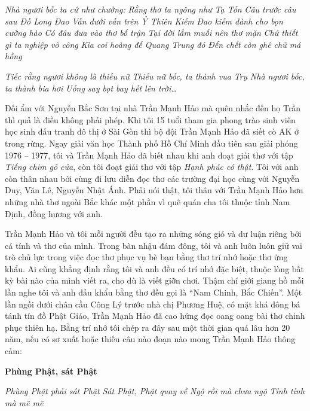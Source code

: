 \documentclass[../main.tex]{subfiles}
\begin{document}
\begin{multicols}{2}
\begin{blockquote}
\textit{Nhà ngươi bốc ta cứ như chưởng:}        
\textit{Rằng thơ ta ngông như Tạ Tốn}        
\textit{Câu trước câu sau Ðồ Long Ðao}        
\textit{Vần dưới vần trên Ỷ Thiên Kiếm}        
\textit{Ðao kiếm dành cho bọn cường hào}        
\textit{Có đâu đưa vào thơ bố trận}        
\textit{Tại đời lắm muối nên thơ mặn}        
\textit{Chứ thiết gì ta nghiệp võ công}        
\textit{Kìa coi hoàng đế Quang Trung đó} 
\textit{Ðến chết còn ghê chữ má hồng} 
        
\textit{Tiếc rằng ngươi không là thiếu nữ}        
\textit{Thiếu nữ bốc, ta thành vua Trụ}        
\textit{Nhà ngươi bốc, ta thành bia hơi} 
\textit{Uống say bọt bay hết lên trời…} 

\end{blockquote}
 
Ðối ẩm với Nguyễn Bắc Sơn tại nhà Trần Mạnh Hảo mà quên nhắc đến họ Trần thì quả là điều không phải phép. Khi tôi 15 tuổi tham gia phong trào sinh viên học sinh đấu tranh đô thị ở Sài Gòn thì bộ đội Trần Mạnh Hảo đã siết cò AK ở trong rừng. Ngay giải văn học Thành phố Hồ Chí Minh đầu tiên sau giải phóng 1976 – 1977, tôi và Trần Mạnh Hảo đã biết nhau khi anh đoạt giải thơ với tập \textit{Tiếng chim gõ cửa}, còn tôi đoạt giải thơ với tập \textit{Hạnh phúc có thật}. Tôi với anh còn thân nhau bởi cùng đi lưu diễn đọc thơ các trường đại học cùng với Nguyễn Duy, Văn Lê, Nguyễn Nhật Ánh. Phải nói thật, tôi thân với Trần Mạnh Hảo hơn những nhà thơ ngoài Bắc khác một phần vì quê quán cha tôi thuộc tỉnh Nam Ðịnh, đồng hương với anh. 
 
Trần Mạnh Hảo và tôi mỗi người đều tạo ra những sóng gió và dư luận riêng bởi cá tính và thơ của mình. Trong bàn nhậu đám đông, tôi và anh luôn luôn giữ vai trò chủ lực trong việc đọc thơ phục vụ bè bạn bằng thơ trí nhớ hoặc thơ ứng khẩu. Ai cũng khẳng định rằng tôi và anh đều có trí nhớ đặc biệt, thuộc lòng bất kỳ bài nào của mình viết ra, cho dù là viết giỡn chơi. Thậm chí giới giang hồ mỗi lần nghe tôi và anh đấu khẩu bằng thơ đều gọi là “Nam Chinh, Bắc Chiến”. Một lần ngồi dưới chân cầu Công Lý trước nhà chị Phương Huệ, có mặt khá đông bá tánh tín đồ Phật Giáo, Trần Mạnh Hảo đã cao hứng đọc oang oang bài thơ chinh phục thiên hạ. Bằng trí nhớ tôi chép ra đây sau một thời gian quá lâu hơn 20 năm, nếu có sơ xuất hoặc thiếu câu nào đoạn nào mong Trần Mạnh Hảo thông cảm: 
\begin{blockquote}
 
\textbf{Phùng Phật, sát Phật} 
        
\textit{Phùng Phật phải sát Phật}        
\textit{Sát Phật, Phật quay về}        
\textit{Ngộ rồi mà chưa ngộ} 
\textit{Tỉnh tỉnh mà mê mê} 
        

\end{blockquote}
\end{multicols}
\end{document}
